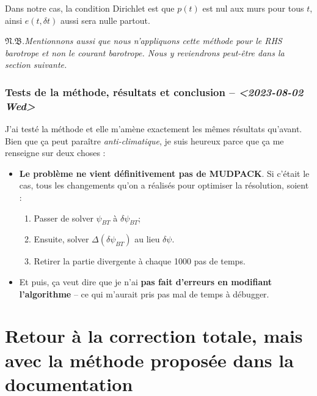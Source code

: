 \documentclass[10pt]{report}
\numberwithin{equation}{section}
\newcommand{\pt}{\hspace{1pt}} %
\newcommand{\nb}{\underline{{\footnotesize\EightStarConvex}\pt $\mathfrak{N.B.}$\vphantom{p}}\hspace{3pt}}
\begin{document}
Dans notre cas, la condition Dirichlet est que \(p(t)\) est nul aux murs pour tous \(t\), ainsi \(e(t,\delta t)\) aussi sera nulle partout.\bigskip

\nb \emph{Mentionnons aussi que nous n'appliquons cette méthode pour le RHS barotrope et non le courant barotrope. Nous y reviendrons peut-être dans la section suivante.}

\subsubsection{Tests de la méthode, résultats et conclusion -- \textit{<2023-08-02 Wed>}}
\label{sec:orgc8dfc65}
J'ai testé la méthode et elle m'amène exactement les mêmes résultats qu'avant.
Bien que ça peut paraître \emph{anti-climatique}, je suis heureux parce que ça me renseigne sur deux choses :
\begin{itemize}
\item \textbf{Le problème ne vient définitivement pas de MUDPACK}.
Si c'était le cas, tous les changements qu'on a réalisés pour optimiser la résolution, soient :
\begin{enumerate}
\item Passer de solver \(\psi_{BT}\) à \(\delta \psi_{BT}\);
\item Ensuite, solver \(\Delta (\delta \psi_{BT})\) au lieu \(\delta\psi\).
\item Retirer la partie divergente à chaque 1000 pas de temps.
\end{enumerate}

\item Et puis, ça veut dire que je n'ai \textbf{pas fait d'erreurs en modifiant l'algorithme} -- ce qui m'aurait pris pas mal de temps à débugger.
\end{itemize}


\section{Retour à la correction totale, mais avec la méthode proposée dans la documentation}
\label{sec:orga5dfcb6}
\end{document}
